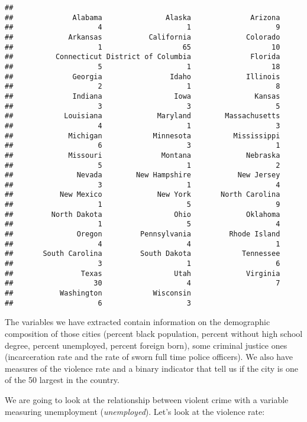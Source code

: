 \documentclass[
]{book}
\begin{document}
\begin{verbatim}
## 
##              Alabama               Alaska              Arizona 
##                    4                    1                    9 
##             Arkansas           California             Colorado 
##                    1                   65                   10 
##          Connecticut District of Columbia              Florida 
##                    5                    1                   18 
##              Georgia                Idaho             Illinois 
##                    2                    1                    8 
##              Indiana                 Iowa               Kansas 
##                    3                    3                    5 
##            Louisiana             Maryland        Massachusetts 
##                    4                    1                    3 
##             Michigan            Minnesota          Mississippi 
##                    6                    3                    1 
##             Missouri              Montana             Nebraska 
##                    5                    1                    2 
##               Nevada        New Hampshire           New Jersey 
##                    3                    1                    4 
##           New Mexico             New York       North Carolina 
##                    1                    5                    9 
##         North Dakota                 Ohio             Oklahoma 
##                    1                    5                    4 
##               Oregon         Pennsylvania         Rhode Island 
##                    4                    4                    1 
##       South Carolina         South Dakota            Tennessee 
##                    3                    1                    6 
##                Texas                 Utah             Virginia 
##                   30                    4                    7 
##           Washington            Wisconsin 
##                    6                    3
\end{verbatim}

The variables we have extracted contain information on the demographic composition of those cities (percent black population, percent without high school degree, percent unemployed, percent foreign born), some criminal justice ones (incarceration rate and the rate of sworn full time police officers). We also have measures of the violence rate and a binary indicator that tell us if the city is one of the 50 largest in the country.

We are going to look at the relationship between violent crime with a variable measuring unemployment (\emph{unemployed}). Let's look at the violence rate:
\end{document}
